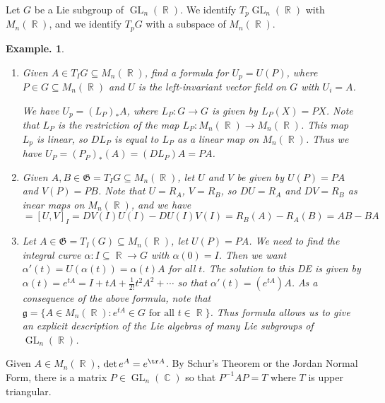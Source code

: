 \documentclass[11pt, a4paper]{memoir}
\DeclareMathOperator{\R}{{\mathbb{R}}}
\DeclareMathOperator{\C}{{\mathbb{C}}}
\theoremstyle{change}
\theoremstyle{plain}
\theoremstyle{nonumberplain}
\newtheorem{example}{Example.}
\DeclareMathOperator{\GL}{GL}
\numberwithin{equation}{section}
\begin{document}
Let $G$ be a Lie subgroup of $\GL_n(\R)$.
We identify $T_p\GL_n(\R)$ with $M_n(\R)$, and we identify $T_pG$ with a subspace of $M_n(\R)$.
\begin{example}
    \begin{enumerate}[nl]
        \item Given $A\in T_IG\subseteq M_n(\R)$, find a formula for $U_p=U(P)$, where $P\in G\subseteq M_n(\R)$ and $U$ is the left-invariant vector field on $G$ with $U_i=A$.

            We have $U_p=(L_P)_*A$, where $L_P:G\to G$ is given by $L_P(X)=PX$.
            Note that $L_P$ is the restriction of the map $L_P:M_n(\R)\to M_n(\R)$.
            This map $L_p$ is linear, so $DL_P$ is equal to $L_P$ as a linear map on $M_n(\R)$.
            Thus we have $U_P=(P_P)_*(A)=(DL_P)A=PA$.
        \item Given $A,B\in\mathfrak{G}=T_IG\subseteq M_n(\R)$, let $U$ and $V$ be given by $U(P)=PA$ and $V(P)=PB$.
            Note that $U=R_A$, $V=R_B$, so $DU=R_A$ and $DV=R_B$ as inear maps on $M_n(\R)$, and we have
            \begin{equation*}
                [A,B]=[U,V]_I=DV(I)U(I)-DU(I)V(I)=R_B(A)-R_A(B)=AB-BA
            \end{equation*}
        \item Let $A\in\mathfrak{G}=T_I(G)\subseteq M_n(\R)$, let $U(P)=PA$.
            We need to find the integral curve $\alpha:I\subseteq\R\to G$ with $\alpha(0)=I$.
            Then we want $\alpha'(t)=U(\alpha(t))=\alpha(t)A$ for all $t$.
            The solution to this DE is given by $\alpha(t)=e^{tA}=I+tA+\frac{1}{2!}t^2A^2+\cdots$ so that $\alpha'(t)=(e^{tA})A$.
            As a consequence of the above formula, note that $\mathfrak{g}=\{A\in M_n(\R):e^{tA}\in G\text{ for all }t\in\R\}$.
            Thus formula allows us to give an explicit description of the Lie algebras of many Lie subgroups of $\GL_n(\R)$.
    \end{enumerate}
\end{example}
Given $A\in M_n(\R)$, $\det e^A=e^{\tr A}$.
By Schur's Theorem or the Jordan Normal Form, there is a matrix $P\in\GL_n(\C)$ so that $P^{-1}AP=T$ where $T$ is upper triangular.
\end{document}
